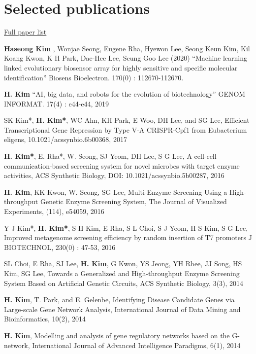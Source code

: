 \documentclass[
]{book}
\begin{document}
\hypertarget{selected-publications}{%
\chapter{Selected publications}\label{selected-publications}}

\href{https://oak.kribb.re.kr/researcher-profile?ep=137\&type=all\&sort_by=dc.date.issued_dt\&order=DESC}{Full
paper list}

\textbf{Haseong Kim }, Wonjae Seong, Eugene Rha, Hyewon Lee, Seong Keun
Kim, Kil Koang Kwon, K H Park, Dae-Hee Lee, Seung Goo Lee (2020)
``Machine learning linked evolutionary biosensor array for highly
sensitive and specific molecular identification'' Biosens Bioelectron.
170(0) : 112670-112670.

\textbf{H. Kim } ``AI, big data, and robots for the evolution of
biotechnology'' GENOM INFORMAT. 17(4) : e44-e44, 2019

SK Kim*, \textbf{H. Kim*}, WC Ahn, KH Park, E Woo, DH Lee, and SG Lee,
Efficient Transcriptional Gene Repression by Type V-A CRISPR-Cpf1 from
Eubacterium eligens, 10.1021/acssynbio.6b00368, 2017

\textbf{H. Kim*}, E. Rha*, W. Seong, SJ Yeom, DH Lee, S G Lee, A
cell-cell communication-based screening system for novel microbes with
target enzyme activities, ACS Synthetic Biology, DOI:
10.1021/acssynbio.5b00287, 2016

\textbf{H. Kim}, KK Kwon, W. Seong, SG Lee, Multi-Enzyme Screening Using
a High-throughput Genetic Enzyme Screening System, The Journal of
Visualized Experiments, (114), e54059, 2016

Y J Kim*, \textbf{H. Kim*}, S H Kim, E Rha, S-L Choi, S J Yeom, H S Kim,
S G Lee, Improved metagenome screening efficiency by random insertion of
T7 promoters J BIOTECHNOL, 230(0) : 47-53, 2016

SL Choi, E Rha, SJ Lee, \textbf{H. Kim}, G Kwon, YS Jeong, YH Rhee, JJ
Song, HS Kim, SG Lee, Towards a Generalized and High-throughput Enzyme
Screening System Based on Artificial Genetic Circuits, ACS Synthetic
Biology, 3(3), 2014

\textbf{H. Kim}, T. Park, and E. Gelenbe, Identifying Disease Candidate
Genes via Large-scale Gene Network Analysis, International Journal of
Data Mining and Bioinformatics, 10(2), 2014

\textbf{H. Kim}, Modelling and analysis of gene regulatory networks
based on the G-network, International Journal of Advanced Intelligence
Paradigms, 6(1), 2014

\backmatter
\end{document}

